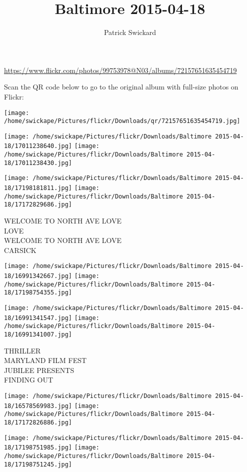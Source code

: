 \documentclass[10pt,letterpaper]{article}
\title{Baltimore 2015-04-18}
\author{Patrick Swickard}
\date{}
\begin{document}
\maketitle

\url{https://www.flickr.com/photos/99753978@N03/albums/72157651635454719}

Scan the QR code below to go to the original album with full-size photos on Flickr:

\texttt{[image: /home/swickape/Pictures/flickr/Downloads/qr/72157651635454719.jpg]}
\pagebreak

\texttt{[image: /home/swickape/Pictures/flickr/Downloads/Baltimore 2015-04-18/17011238640.jpg]}
\texttt{[image: /home/swickape/Pictures/flickr/Downloads/Baltimore 2015-04-18/17011238430.jpg]}

\texttt{[image: /home/swickape/Pictures/flickr/Downloads/Baltimore 2015-04-18/17198181811.jpg]}
\texttt{[image: /home/swickape/Pictures/flickr/Downloads/Baltimore 2015-04-18/17172829686.jpg]}

WELCOME TO NORTH AVE LOVE\\
LOVE\\
WELCOME TO NORTH AVE LOVE\\
CARSICK
\pagebreak

\texttt{[image: /home/swickape/Pictures/flickr/Downloads/Baltimore 2015-04-18/16991342667.jpg]}
\texttt{[image: /home/swickape/Pictures/flickr/Downloads/Baltimore 2015-04-18/17198754355.jpg]}

\texttt{[image: /home/swickape/Pictures/flickr/Downloads/Baltimore 2015-04-18/16991341547.jpg]}
\texttt{[image: /home/swickape/Pictures/flickr/Downloads/Baltimore 2015-04-18/16991341007.jpg]}

THRILLER\\
MARYLAND FILM FEST\\
JUBILEE PRESENTS\\
FINDING OUT
\pagebreak

\texttt{[image: /home/swickape/Pictures/flickr/Downloads/Baltimore 2015-04-18/16578569983.jpg]}
\texttt{[image: /home/swickape/Pictures/flickr/Downloads/Baltimore 2015-04-18/17172826886.jpg]}

\texttt{[image: /home/swickape/Pictures/flickr/Downloads/Baltimore 2015-04-18/17198751985.jpg]}
\texttt{[image: /home/swickape/Pictures/flickr/Downloads/Baltimore 2015-04-18/17198751245.jpg]}
\end{document}
